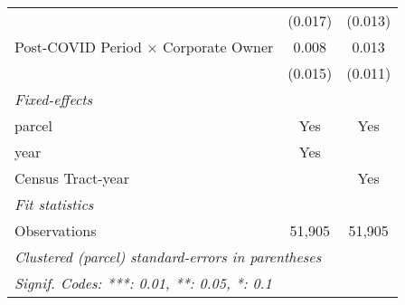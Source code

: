 \begin{table}[htbp]
\begin{tabular}{lcc}
                                                  & (0.017)                   & (0.013)\\   
      Post-COVID Period $\times$ Corporate Owner  & 0.008                     & 0.013\\   
                                                  & (0.015)                   & (0.011)\\   
      \midrule
      \emph{Fixed-effects}\\
      parcel                                      & Yes                       & Yes\\  
      year                                        & Yes                       & \\  
      Census Tract-year                           &                           & Yes\\  
      \midrule
      \emph{Fit statistics}\\
      Observations                                & 51,905                    & 51,905\\  
      \midrule \midrule
      \multicolumn{3}{l}{\emph{Clustered (parcel) standard-errors in parentheses}}\\
      \multicolumn{3}{l}{\emph{Signif. Codes: ***: 0.01, **: 0.05, *: 0.1}}\\
   \end{tabular}
\end{table}
